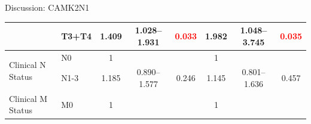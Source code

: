 \documentclass[paperwidth=78cm,paperheight=110cm,portrait]{baposter}
\begin{document}
\begin{poster}
\begin{posterbox}[name=problems,column=2,below=install]{Discussion: CAMK2N1}
\begin{center}
{\begin{tabular}{|l|l|c|c|c|c|c|c|}
\cline{2-8}
                                        & T3+T4                                                                               & 1.409                                                                          & 1.028--1.931                                                                   & \textcolor{red}{0.033}                                                        & 1.982                                                                          & 1.048--3.745                                                                   & \textcolor{red}{0.035}                                                         \\ 
\hline
\multirow{2}{*}{Clinical N Status}      & {\cellcolor[rgb]{0.62,0.812,0.878}}N0                                               & {\cellcolor[rgb]{0.62,0.812,0.878}}1                                           & {\cellcolor[rgb]{0.62,0.812,0.878}}                                           & {\cellcolor[rgb]{0.62,0.812,0.878}}                                           & {\cellcolor[rgb]{0.62,0.812,0.878}}1                                           & {\cellcolor[rgb]{0.62,0.812,0.878}}                                           & {\cellcolor[rgb]{0.62,0.812,0.878}}                                            \\ 
\cline{2-8}
                                        & N1-3                                                                                & 1.185                                                                          & 0.890--1.577                                                                   & 0.246                                                                         & 1.145                                                                          & 0.801--1.636                                                                   & 0.457                                                                          \\ 
\hline
\multirow{2}{*}{Clinical M Status}      & {\cellcolor[rgb]{0.62,0.812,0.878}}M0                                               & {\cellcolor[rgb]{0.62,0.812,0.878}}1                                           & {\cellcolor[rgb]{0.62,0.812,0.878}}                                           & {\cellcolor[rgb]{0.62,0.812,0.878}}                                           & {\cellcolor[rgb]{0.62,0.812,0.878}}1                                           & {\cellcolor[rgb]{0.62,0.812,0.878}}                                           & {\cellcolor[rgb]{0.62,0.812,0.878}}                                            \\ 

\end{tabular}}
\end{center}
\end{posterbox}
\end{poster}
\end{document}
